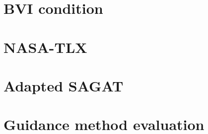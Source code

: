 

\section{BVI condition}
\label{sec:bvi_condition}
\vspace{0.25in}



\section{NASA-TLX}
\label{sec:nasa_tlx}


\pagebreak

\section{Adapted SAGAT}
\label{apsec:sagat}


\pagebreak

\section{Guidance method evaluation}
\label{sec:guidace_evaluation}


